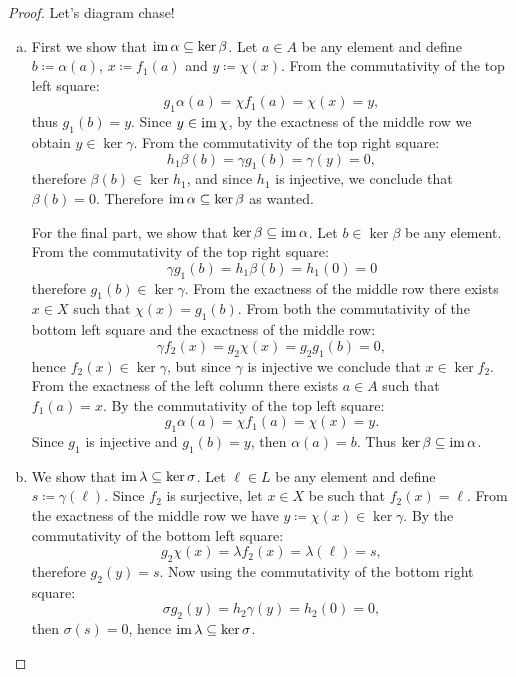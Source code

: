 \begin{proof}
Let's diagram chase!
\begin{enumerate}[(a)]\setlength\itemsep{0em}
\item First we show that \(\operatorname{im} \alpha \subseteq \ker \beta\). Let \(a \in A\) be
  any element and define \(b \coloneq \alpha(a)\), \(x \coloneq f_1(a)\) and \(y
  \coloneq \chi(x)\). From the commutativity of the top left square:
  \[
  g_1\alpha(a) = \chi f_1(a) = \chi(x) = y,
  \]
  thus \(g_1(b) = y\). Since \(y \in \operatorname{im} \chi\), by the exactness of the middle
  row we obtain \(y \in \ker \gamma\). From the commutativity of the top right
  square:
  \[
  h_1 \beta(b) = \gamma g_1(b) = \gamma(y) = 0,
  \]
  therefore \(\beta(b) \in \ker h_1\), and since \(h_1\) is injective, we
  conclude that \(\beta(b) = 0\). Therefore \(\operatorname{im} \alpha \subseteq \ker \beta\)
  as wanted.

  For the final part, we show that \(\ker \beta \subseteq \operatorname{im} \alpha\). Let
  \(b \in \ker \beta\) be any element. From the commutativity of the top right
  square:
  \[
  \gamma g_1(b) = h_1 \beta(b) = h_1(0) = 0
  \]
  therefore \(g_1(b) \in \ker \gamma\). From the exactness of the middle row
  there exists \(x \in X\) such that \(\chi(x) = g_1(b)\). From both the
  commutativity of the bottom left square and the exactness of the middle row:
  \[
  \gamma f_2(x) = g_2 \chi(x) = g_2 g_1(b) = 0,
  \]
  hence \(f_2(x) \in \ker \gamma\), but since \(\gamma\) is injective we
  conclude that \(x \in \ker f_2\). From the exactness of the left column there
  exists \(a \in A\) such that \(f_1(a) = x\). By the commutativity of the top
  left square:
  \[
  g_1 \alpha(a) = \chi f_1(a) = \chi(x) = y.
  \]
  Since \(g_1\) is injective and \(g_1(b) = y\), then \(\alpha(a) = b\). Thus
  \(\ker \beta \subseteq \operatorname{im} \alpha\).

\item We show that \(\operatorname{im} \lambda \subseteq \ker \sigma\). Let \(\ell \in L\) be
  any element and define \(s \coloneq \gamma(\ell)\). Since \(f_2\) is
  surjective, let \(x \in X\) be such that \(f_2(x) = \ell\). From the exactness
  of the middle row we have \(y \coloneq \chi(x) \in \ker \gamma\). By the
  commutativity of the bottom left square:
  \[
g_2\chi(x) = \lambda f_2(x) = \lambda(\ell) = s,
  \]
  therefore \(g_2(y) = s\). Now using the commutativity of the bottom right
  square:
  \[
\sigma g_2(y) = h_2 \gamma(y) = h_2(0) = 0,
  \]
  then \(\sigma(s) = 0\), hence \(\operatorname{im} \lambda \subseteq \ker \sigma\).


\end{enumerate}
\end{proof}
